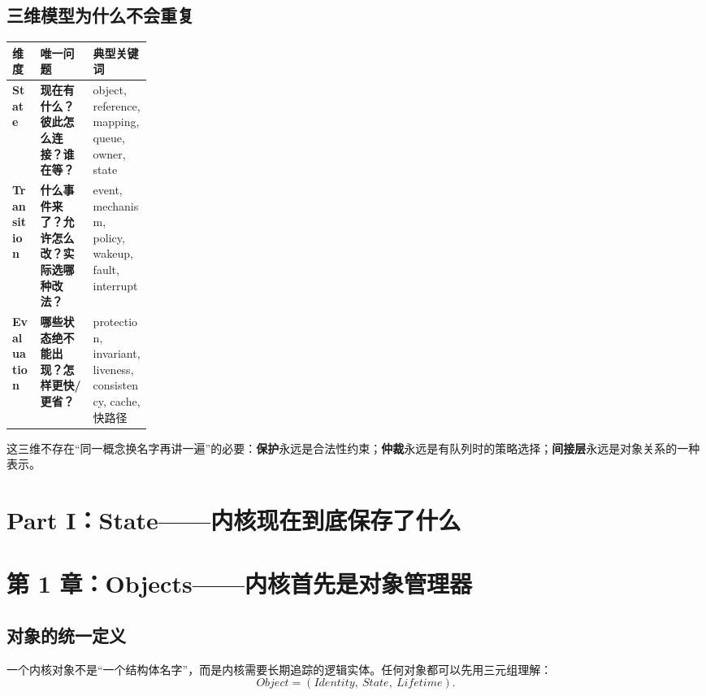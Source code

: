 \documentclass[11pt,a4paper]{ctexart}
\newcommand{\kw}[1]{\textbf{#1}}
\begin{document}
\subsection{三维模型为什么不会重复}
\begin{center}
\small
\renewcommand{\arraystretch}{1.25}
\begin{tabularx}{\linewidth}{>{\bfseries}p{0.20\linewidth} X X}
\toprule
维度 & 唯一问题 & 典型关键词 \\
\midrule
State & \kw{现在有什么？彼此怎么连接？谁在等？} & object, reference, mapping, queue, owner, state \\
Transition & \kw{什么事件来了？允许怎么改？实际选哪种改法？} & event, mechanism, policy, wakeup, fault, interrupt \\
Evaluation & \kw{哪些状态绝不能出现？怎样更快/更省？} & protection, invariant, liveness, consistency, cache, 快路径 \\
\bottomrule
\end{tabularx}
\end{center}

这三维不存在“同一概念换名字再讲一遍”的必要：\kw{保护}永远是合法性约束；\kw{仲裁}永远是有队列时的策略选择；\kw{间接层}永远是对象关系的一种表示。

\newpage
\section{Part I：State——内核现在到底保存了什么}

\section{第 1 章：Objects——内核首先是对象管理器}

\subsection{对象的统一定义}
一个内核对象不是“一个结构体名字”，而是内核需要长期追踪的逻辑实体。任何对象都可以先用三元组理解：
\[
\boxed{Object=(Identity,\ State,\ Lifetime)}.
\]
\end{document}
